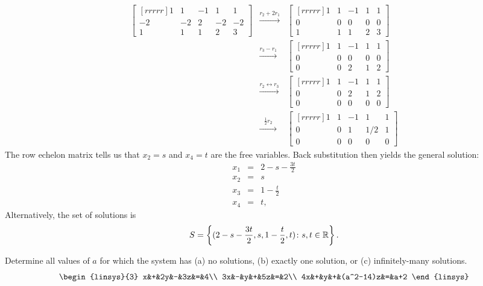 \begin{solution}
\begin{eqnarray*}
\begin{bmatrix}[rrrrr]
1&1&-1&1&1\\
-2&-2&2&-2&-2\\
1&1&1&2&3
\end{bmatrix}
&\xrightarrow[\hspace{35pt}]{r_2+2r_1}&
\begin{bmatrix}[rrrrr]
1&1&-1&1&1\\
0&0&0&0&0\\
1&1&1&2&3
\end{bmatrix}\\
&\xrightarrow[\hspace{35pt}]{r_3-r_1}&
\begin{bmatrix}[rrrrr]
1&1&-1&1&1\\
0&0&0&0&0\\
0&0&2&1&2
\end{bmatrix}\\
&\xrightarrow[\hspace{35pt}]{r_2\leftrightarrow r_3 }&
\begin{bmatrix}[rrrrr]
1&1&-1&1&1\\
0&0&2&1&2\\
0&0&0&0&0
\end{bmatrix}\\
&\xrightarrow[\hspace{35pt}]{\frac{1}{2}r_2}&
\begin{bmatrix}[rrrrr]
\boxed{1}&1&-1&1&1\\
0&0&\boxed{1}&1/2&1\\
0&0&0&0&0
\end{bmatrix}
\end{eqnarray*}
The row echelon matrix tells us that $x_2=s$ and $x_4=t$ are the free variables. Back substitution then yields the general solution:
\begin{eqnarray*}
x_1&=&2-s-\frac{3t}{2}\\
x_2&=&s\\
x_3&=&1-\frac{t}{2}\\
x_4&=&t,
\end{eqnarray*}
Alternatively, the set of solutions is 
\[
S=\left\{(2-s-\frac{3t}{2},s,1-\frac{t}{2},t)\colon s, t\in{\mathbb R}\right\}.
\] 
\end{solution}
\ii
Determine all values of $a$ for which the system has (a) no solutions, (b) exactly one solution, or (c) infinitely-many solutions. 
\[
\begin{linsys}{3}
x&+&2y&-&3z&=&4\\
3x&-&y&+&5z&=&2\\
4x&+&y&+&(a^2-14)z&=&a+2
\end{linsys}
\]
